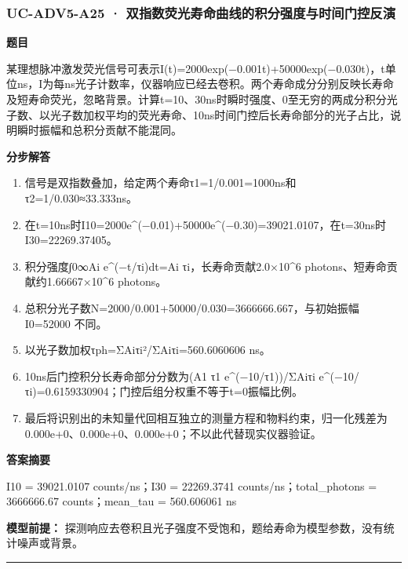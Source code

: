 \documentclass[UTF8,11pt,a4paper]{ctexart}
\begin{document}
\subsubsection*{UC-ADV5-A25 · 双指数荧光寿命曲线的积分强度与时间门控反演}
\noindent\textbf{题目}\par
某理想脉冲激发荧光信号可表示I(t)=2000exp(−0.001t)+50000exp(−0.030t)，t单位ns，I为每ns光子计数率，仪器响应已经去卷积。两个寿命成分分别反映长寿命及短寿命荧光，忽略背景。计算t=10、30ns时瞬时强度、0至无穷的两成分积分光子数、以光子数加权平均的荧光寿命、10ns时间门控后长寿命部分的光子占比，说明瞬时振幅和总积分贡献不能混同。\par
\medskip\noindent\textbf{分步解答}
\begin{enumerate}
\item 信号是双指数叠加，给定两个寿命τ1=1/0.001=1000ns和τ2=1/0.030≈33.333ns。
\item 在t=10ns时I10=2000e\textasciicircum{}(−0.01)+50000e\textasciicircum{}(−0.30)=39021.0107，在t=30ns时I30=22269.37405。
\item 积分强度∫0∞Ai e\textasciicircum{}(−t/τi)dt=Ai τi，长寿命贡献2.0×10\textasciicircum{}6 photons、短寿命贡献约1.66667×10\textasciicircum{}6 photons。
\item 总积分光子数N=2000/0.001+50000/0.030=3666666.667，与初始振幅I0=52000 不同。
\item 以光子数加权τph=ΣAiτi²/ΣAiτi=560.6060606 ns。
\item 10ns后门控积分长寿命部分分数为(A1 τ1 e\textasciicircum{}(−10/τ1))/ΣAiτi e\textasciicircum{}(−10/τi)=0.6159330904；门控后组分权重不等于t=0振幅比例。
\item 最后将识别出的未知量代回相互独立的测量方程和物料约束，归一化残差为 0.000e+0、0.000e+0、0.000e+0；不以此代替现实仪器验证。
\end{enumerate}
\noindent\textbf{答案摘要}\par
I10 = 39021.0107 counts/ns；I30 = 22269.3741 counts/ns；total\_photons = 3666666.67 counts；mean\_tau = 560.606061 ns\par
\noindent\textbf{模型前提：}
探测响应去卷积且光子强度不受饱和，题给寿命为模型参数，没有统计噪声或背景。\par
\medskip\hrule\medskip
{}
\end{document}
